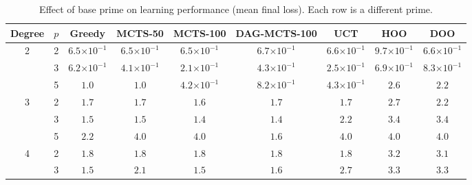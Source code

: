 
\begin{table}[ht]
\centering
\caption{Effect of base prime on learning performance (mean final loss). Each row is a different prime.}
\label{tab:poly-learning-prime}
\begin{tabular}{ccccccccc}
\toprule
Degree & $p$ & Greedy & MCTS-50 & MCTS-100 & DAG-MCTS-100 & UCT & HOO & DOO \\
\midrule
2 & 2 & $6.5{\scriptstyle\times 10^{-1}}$ & $6.5{\scriptstyle\times 10^{-1}}$ & $6.5{\scriptstyle\times 10^{-1}}$ & $6.7{\scriptstyle\times 10^{-1}}$ & $6.6{\scriptstyle\times 10^{-1}}$ & $9.7{\scriptstyle\times 10^{-1}}$ & $6.6{\scriptstyle\times 10^{-1}}$ \\
 & 3 & $6.2{\scriptstyle\times 10^{-1}}$ & $4.1{\scriptstyle\times 10^{-1}}$ & $2.1{\scriptstyle\times 10^{-1}}$ & $4.3{\scriptstyle\times 10^{-1}}$ & $2.5{\scriptstyle\times 10^{-1}}$ & $6.9{\scriptstyle\times 10^{-1}}$ & $8.3{\scriptstyle\times 10^{-1}}$ \\
 & 5 & $1.0$ & $1.0$ & $4.2{\scriptstyle\times 10^{-1}}$ & $8.2{\scriptstyle\times 10^{-1}}$ & $4.3{\scriptstyle\times 10^{-1}}$ & $2.6$ & $2.2$ \\
\midrule
3 & 2 & $1.7$ & $1.7$ & $1.6$ & $1.7$ & $1.7$ & $2.7$ & $2.2$ \\
 & 3 & $1.5$ & $1.5$ & $1.4$ & $1.4$ & $2.2$ & $3.4$ & $3.4$ \\
 & 5 & $2.2$ & $4.0$ & $4.0$ & $1.6$ & $4.0$ & $4.0$ & $4.0$ \\
\midrule
4 & 2 & $1.8$ & $1.8$ & $1.8$ & $1.8$ & $1.8$ & $3.2$ & $3.1$ \\
 & 3 & $1.5$ & $2.1$ & $1.5$ & $1.6$ & $2.7$ & $3.3$ & $3.3$ \\
\bottomrule
\end{tabular}
\end{table}


